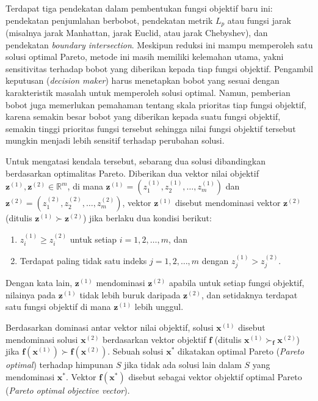 Terdapat tiga pendekatan dalam pembentukan fungsi objektif baru ini: pendekatan penjumlahan berbobot, pendekatan metrik $L_p$ atau fungsi jarak (misalnya jarak Manhattan, jarak Euclid, atau jarak Chebyshev), dan pendekatan \textit{boundary intersection}. Meskipun reduksi ini mampu memperoleh satu solusi optimal Pareto, metode ini masih memiliki kelemahan utama, yakni sensitivitas terhadap bobot yang diberikan kepada tiap fungsi objektif. Pengambil keputusan (\textit{decision maker}) harus menetapkan bobot yang sesuai dengan karakteristik masalah untuk memperoleh solusi optimal. Namun, pemberian bobot juga memerlukan pemahaman tentang skala prioritas tiap fungsi objektif, karena semakin besar bobot yang diberikan kepada suatu fungsi objektif, semakin tinggi prioritas fungsi tersebut sehingga nilai fungsi objektif tersebut mungkin menjadi lebih sensitif terhadap perubahan solusi.

Untuk mengatasi kendala tersebut, sebarang dua solusi dibandingkan berdasarkan optimalitas Pareto. Diberikan dua vektor nilai objektif $\mathbf{z}^{(1)}, \mathbf{z}^{(2)} \in \mathbb{R}^m$, di mana $\mathbf{z}^{(1)} = (z_1^{(1)},z_2^{(1)},\dots,z_m^{(1)})$ dan $\mathbf{z}^{(2)} = (z_1^{(2)},z_2^{(2)},\dots,z_m^{(2)})$, vektor $\mathbf{z}^{(1)}$ disebut mendominasi vektor $\mathbf{z}^{(2)}$ (ditulis $\mathbf{z}^{(1)} \succ \mathbf{z}^{(2)}$) jika berlaku dua kondisi berikut:
\begin{enumerate}
  \item {$z_i^{(1)} \geq z_i^{(2)}$ untuk setiap $i = 1,2,\dots,m$, dan} 
  \item {Terdapat paling tidak satu indeks $j = 1,2,\dots,m$ dengan $z_j^{(1)} > z_j^{(2)}$.} 
\end{enumerate}

Dengan kata lain, $\mathbf{z}^{(1)}$ mendominasi $\mathbf{z}^{(2)}$ apabila untuk setiap fungsi objektif, nilainya pada $\mathbf{z}^{(1)}$ tidak lebih buruk daripada $\mathbf{z}^{(2)}$, dan setidaknya terdapat satu fungsi objektif di mana $\mathbf{z}^{(1)}$ lebih unggul.

Berdasarkan dominasi antar vektor nilai objektif, solusi $\mathbf{x}^{(1)}$ disebut mendominasi solusi $\mathbf{x}^{(2)}$ berdasarkan vektor objektif $\mathbf{f}$  (ditulis $\mathbf{x}^{(1)} \succ_\mathbf{f} \mathbf{x}^{(2)}$) jika $\mathbf{f}(\mathbf{x}^{(1)}) \succ \mathbf{f}(\mathbf{x}^{(2)})$. Sebuah solusi $\mathbf{x}^{*}$ dikatakan optimal Pareto (\textit{Pareto optimal}) terhadap himpunan $S$ jika tidak ada solusi lain dalam $S$ yang mendominasi $\mathbf{x}^*$. Vektor $\mathbf{f}(\mathbf{x}^*)$ disebut sebagai vektor objektif optimal Pareto (\textit{Pareto optimal objective vector}). 

